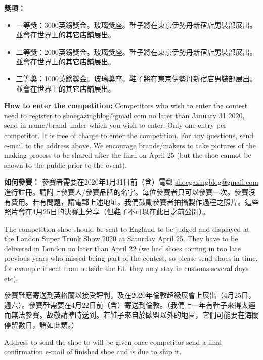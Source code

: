 \begin{paracol}{2}
        \switchcolumn
        \textbf{獎項：}
        \begin{itemize}
            \item 一等獎：3000英鎊獎金。玻璃獎座。鞋子將在東京伊勢丹新宿店男裝部展出。並會在世界上的其它店鋪展出。
            \item 二等獎：2000英鎊獎金。玻璃獎座。鞋子將在東京伊勢丹新宿店男裝部展出。並會在世界上的其它店鋪展出。
            \item 三等獎：1000英鎊獎金。玻璃獎座。鞋子將在東京伊勢丹新宿店男裝部展出。並會在世界上的其它店鋪展出。
        \end{itemize}
        \switchcolumn*

        \textbf{How to enter the competition:}
        Competitors who wish to enter the contest need to register to \href{mailto:shoegazingblog@gmail.com}{shoegazingblog@gmail.com} no later than January 31 2020, send in name/brand under which you wish to enter. Only one entry per competitor. It is free of charge to enter the competition. For any questions, send e-mail to the address above. We encourage brands/makers to take pictures of the making process to be shared after the final on April 25 (but the shoe cannot be shown to the public prior to the event).

        \switchcolumn
        \textbf{如何參賽：}
        參賽者需要在2020年1月31日前（含）電郵
        \href{mailto:shoegazingblog@gmail.com}{shoegazingblog@gmail.com}進行註冊。請附上參賽人/參賽品牌的名字。每位參賽者只可以參賽一次。參賽沒有費用。若有問題，請電郵上述地址。我們鼓勵參賽者拍攝製作過程之照片。這些照片會在4月25日的決賽上分享（但鞋子不可以在此日之前公開）。
        \switchcolumn*

        The competition shoe should be sent to England to be judged and displayed at the London Super Trunk Show 2020 at Saturday April 25. They have to be delivered in London no later than April 22 (we had shoes coming in too late previous years who missed being part of the contest, so please send shoes in time, for example if sent from outside the EU they may stay in customs several days etc).

        \switchcolumn
        參賽鞋應寄送到英格蘭以接受評判，及在2020年倫敦超級展會上展出（4月25日，週六）。參賽鞋需要在4月22日前（含）寄送到倫敦。（我們上一年有鞋子來得太遲而無法參賽。故敬請準時送到。若鞋子來自於歐盟以外的地區，它們可能要在海關停留數日，諸如此類。）
        \switchcolumn*

        Address to send the shoe to will be given once competitor send a final confirmation e-mail of finished shoe and is due to ship it.


\end{paracol}
